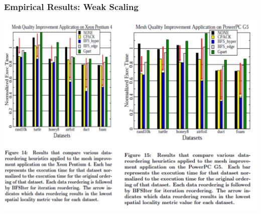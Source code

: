 \documentclass{beamer}
\begin{document}
\begin{frame}[fragile,t]
  \frametitle{Empirical Results: Weak Scaling}

\includegraphics[width=59ex]{Figures/DataReordRes}

\end{frame}
\end{document}
